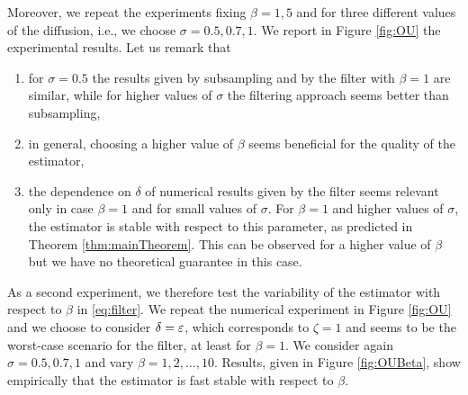 \documentclass[10pt]{article}
\begin{document}
 Moreover, we repeat the experiments fixing $\beta = 1, 5$ and for three different values of the diffusion, i.e., we choose $\sigma = 0.5, 0.7, 1$. We report in Figure \ref{fig:OU} the experimental results. Let us remark that
\begin{enumerate}
	\item for $\sigma = 0.5$ the results given by subsampling and by the filter with $\beta = 1$ are similar, while for higher values of $\sigma$ the filtering approach seems better than subsampling, 
	\item in general, choosing a higher value of $\beta$ seems beneficial for the quality of the estimator,
	\item the dependence on $\delta$ of numerical results given by the filter seems relevant only in case $\beta = 1$ and for small values of $\sigma$. For $\beta = 1$ and higher values of $\sigma$, the estimator is stable with respect to this parameter, as predicted in Theorem \ref{thm:mainTheorem}. This can be observed for a higher value of $\beta$ but we have no theoretical guarantee in this case.
\end{enumerate}

As a second experiment, we therefore test the variability of the estimator with respect to $\beta$ in \eqref{eq:filter}. We repeat the numerical experiment in Figure \ref{fig:OU} and we choose to consider $\delta = \varepsilon$, which corresponds to $\zeta = 1$ and seems to be the worst-case scenario for the filter, at least for $\beta = 1$. We consider again $\sigma = 0.5, 0.7, 1$ and vary $\beta = 1, 2, \ldots, 10$. Results, given in Figure \ref{fig:OUBeta}, show empirically that the estimator is fast stable with respect to $\beta$.
\end{document}
